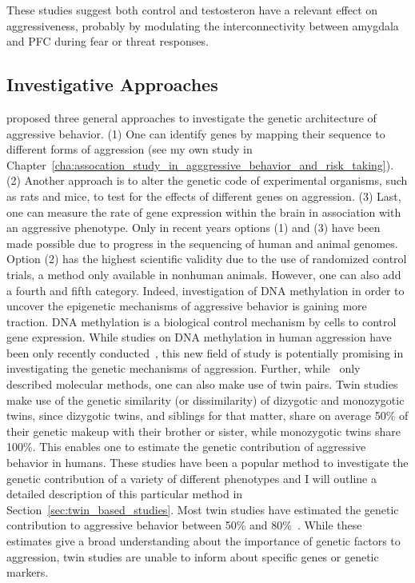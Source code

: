These studies suggest both control and testosteron have a relevant effect on aggressiveness, probably by modulating the interconnectivity between amygdala and PFC during fear or threat responses.

\subsection{Investigative Approaches}
\label{sub:investigation_approaches}

\citet{Maxson2005} proposed three general approaches to investigate the genetic architecture of aggressive behavior.
(1) One can identify genes by mapping their sequence to different forms of aggression (see my own study in Chapter~\ref{cha:assocation_study_in_agggressive_behavior_and_risk_taking}).
(2) Another approach is to alter the genetic code of experimental organisms, such as rats and mice, to test for the effects of different genes on aggression.
(3) Last, one can measure the rate of gene expression within the brain in association with an aggressive phenotype.
Only in recent years options (1) and (3) have been made possible due to progress in the sequencing of human and animal genomes.
Option (2) has the highest scientific validity due to the use of randomized control trials, a method only available in nonhuman animals.
However, one can also add a fourth and fifth category.
Indeed, investigation of DNA methylation in order to uncover the epigenetic mechanisms of aggressive behavior is gaining more traction.
DNA methylation is a biological control mechanism by cells to control gene expression.
While studies on DNA methylation in human aggression have been only recently  conducted~\cite{VanDongen2015a}, this new field of study is potentially promising in investigating the genetic mechanisms of aggression.
Further, while~\citet{Maxson2005} only described molecular methods, one can also make use of twin pairs.
Twin studies make use of the genetic similarity (or dissimilarity) of dizygotic and monozygotic twins, since dizygotic twins, and siblings for that matter, share on average 50\% of their genetic makeup with their brother or sister, while monozygotic twins share 100\%.
This enables one to estimate the genetic contribution of aggressive behavior in humans.
These studies have been a popular method to investigate the genetic contribution of a variety of different phenotypes and I will outline a detailed description of this particular method in Section~\ref{sec:twin_based_studies}. 
Most twin studies have estimated the genetic contribution to aggressive behavior between 50\% and 80\%~\cite{Porsch2016}.
While these estimates give a broad understanding about the importance of genetic factors  to aggression, twin studies are unable to inform about specific genes or genetic markers.

